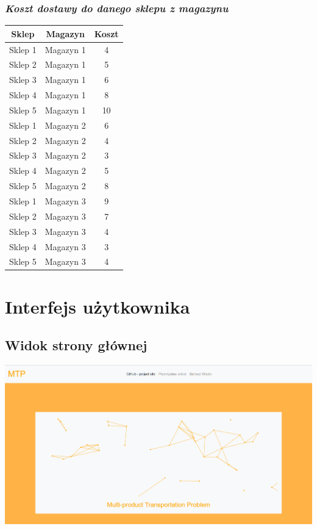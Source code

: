 \documentclass[11pt]{article}
\begin{document}
\subsubsection{\textit{Koszt dostawy do danego sklepu z magazynu}}
\begin{center}
	\begin{tabular}{ |c|c|c | } 
		\hline
		Sklep & Magazyn & Koszt\\
		\hline
		Sklep 1 & Magazyn 1	& 4 \\ 
		\hline
		Sklep 2& 	Magazyn 1& 	5\\ 
		\hline
		Sklep 3	& Magazyn 1	& 6\\ 
		\hline
		Sklep 4	& Magazyn 1& 	8\\ 
		\hline
		Sklep 5& 	Magazyn 1& 	10\\ 
		\hline
		Sklep 1& 	Magazyn 2& 	6\\ 
		\hline
		Sklep 2& 	Magazyn 2& 	4\\ 
		\hline
		Sklep 3& 	Magazyn 2& 	3\\ 
		\hline
		Sklep 4	& Magazyn 2& 	5\\ 
		\hline
		Sklep 5	& Magazyn 2	& 8\\ 
		\hline
		Sklep 1& 	Magazyn 3& 	9\\ 
		\hline
		Sklep 2& 	Magazyn 3& 	7\\ 
		\hline
		Sklep 3& 	Magazyn 3& 	4\\ 
		\hline
		Sklep 4	& Magazyn 3& 	3\\ 
		\hline
		Sklep 5	& Magazyn 3	& 4\\ 
		\hline
	\end{tabular}
\end{center}
\newpage

\section{Interfejs użytkownika}
\subsection{Widok strony głównej}
\includegraphics[width=\textwidth,height=\textheight,keepaspectratio]{1.png}
\end{document}
